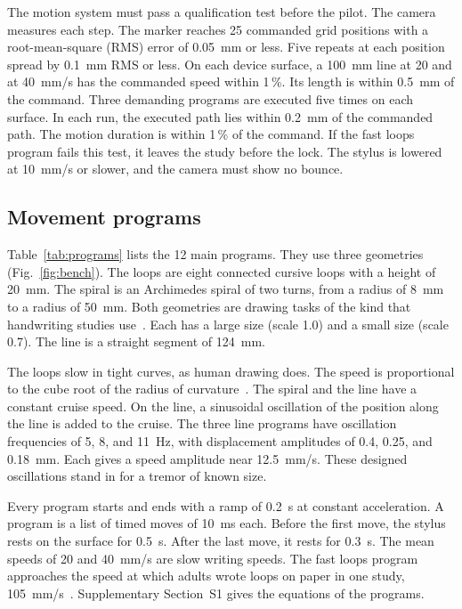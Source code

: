 The motion system must pass a qualification test before the pilot.
The camera measures each step.
The marker reaches 25 commanded grid positions with a root-mean-square (RMS) error of 0.05~mm or less.
Five repeats at each position spread by 0.1~mm RMS or less.
On each device surface, a 100~mm line at 20 and at 40~mm/s has the commanded speed within 1\,\%.
Its length is within 0.5~mm of the command.
Three demanding programs are executed five times on each surface.
In each run, the executed path lies within 0.2~mm of the commanded path.
The motion duration is within 1\,\% of the command.
If the fast loops program fails this test, it leaves the study before the lock.
The stylus is lowered at 10~mm/s or slower, and the camera must show no bounce.

\subsection{Movement programs}
\label{sec:programs}
Table~\ref{tab:programs} lists the 12 main programs.
They use three geometries (Fig.~\ref{fig:bench}).
The loops are eight connected cursive loops with a height of 20~mm.
The spiral is an Archimedes spiral of two turns, from a radius of 8~mm to a radius of 50~mm.
Both geometries are drawing tasks of the kind that handwriting studies use~\cite{Pullman1998,Gerth2016b}.
Each has a large size (scale 1.0) and a small size (scale 0.7).
The line is a straight segment of 124~mm.

The loops slow in tight curves, as human drawing does.
The speed is proportional to the cube root of the radius of curvature~\cite{Lacquaniti1983}.
The spiral and the line have a constant cruise speed.
On the line, a sinusoidal oscillation of the position along the line is added to the cruise.
The three line programs have oscillation frequencies of 5, 8, and 11~Hz, with displacement amplitudes of 0.4, 0.25, and 0.18~mm.
Each gives a speed amplitude near 12.5~mm/s.
These designed oscillations stand in for a tremor of known size.

Every program starts and ends with a ramp of 0.2~s at constant acceleration.
A program is a list of timed moves of 10~ms each.
Before the first move, the stylus rests on the surface for 0.5~s.
After the last move, it rests for 0.3~s.
The mean speeds of 20 and 40~mm/s are slow writing speeds.
The fast loops program approaches the speed at which adults wrote loops on paper in one study, 105~mm/s~\cite{Gerth2016b}.
Supplementary Section~S1 gives the equations of the programs.

